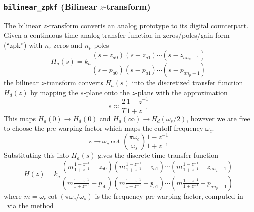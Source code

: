\subsubsection{{\tt bilinear\_zpkf} (Bilinear $z$-transform)}
\label{module:filter:iirdes:bilinear}
The bilinear $z$-transform converts an analog prototype to its digital
counterpart.
Given a continuous time analog transfer function in zeros/poles/gain
form (``zpk'') with $n_z$ zeros and $n_p$ poles
%
\begin{equation}
\label{eqn:filter:iirdes:Ha}
    H_a(s) = k_a
            \frac{
                (s-z_{a0})(s-z_{a1})\cdots(s-z_{an_z-1})
            }{
                (s-p_{a0})(s-p_{a1})\cdots(s-p_{an_p-1})
            }
\end{equation}
%
the bilinear $z$-transform converts $H_a(s)$ into the discretized transfer
function $H_d(z)$ by mapping the $s$-plane onto the $z$-plane with the
approximation
%
\begin{equation}
\label{eqn:filter:iirdes:bilinear}
    s \approx \frac{2}{T}
              \frac{1-z^{-1}}{1 + z^{-1}}
\end{equation}
%
This maps $H_a(0) \rightarrow H_d(0)$ and
$H_a(\infty) \rightarrow H_d(\omega_s/2)$, however we are free to choose
the pre-warping factor which maps the cutoff frequency $\omega_c$.
%
\begin{equation}
\label{eqn:filter:iirdes:bilinear_prewarp}
    s \rightarrow \omega_c
                  \cot\left(\frac{\pi \omega_c}{\omega_s}\right)
                  \frac{1-z^{-1}}{1+z^{-1}}
\end{equation}
%
Substituting this into $H_a(s)$ gives the discrete-time transfer
function
%
\begin{equation}
\label{eqn:filter:iirdes:H}
    H(z) = k_a \frac{
            \left(m\frac{1-z^{-1}}{1+z^{-1}}-z_{a0}\right)
            \left(m\frac{1-z^{-1}}{1+z^{-1}}-z_{a1}\right)
            \cdots
            \left(m\frac{1-z^{-1}}{1+z^{-1}}-z_{an_z-1}\right)
           }{
            \left(m\frac{1-z^{-1}}{1+z^{-1}}-p_{a0}\right)
            \left(m\frac{1-z^{-1}}{1+z^{-1}}-p_{a1}\right)
            \cdots
            \left(m\frac{1-z^{-1}}{1+z^{-1}}-p_{an_p-1}\right)
           }
\end{equation}
%
where $m=\omega_c \cot\left(\pi \omega_c / \omega_s\right)$ is the
frequency pre-warping factor, computed in \liquid\ via the method
